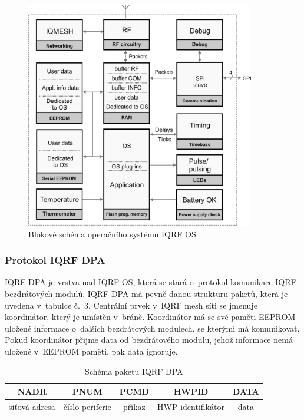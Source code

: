\documentclass[12pt,a4paper]{article}
\begin{document}
\begin{figure}[H]
\centering
\label{fig:foto/iqrf-os}
\includegraphics[width = 100mm]{img/iqrf/os-blokove-schema.png}
\caption{Blokové schéma operačního systému IQRF OS}
\end{figure}

\newpage

\subsubsection{Protokol IQRF DPA}

IQRF DPA\cite{iqrf/dpa} je vrstva nad IQRF OS, která se stará o~protokol komunikace IQRF bezdrátových modulů. IQRF DPA má pevně danou strukturu paketů, která je uvedena v~tabulce č.~3. Centrální prvek v~IQRF mesh síti se jmenuje koordinátor, který je umístěn v~bráně. Koordinátor má se své paměti EEPROM uložené informace o~dalších bezdrátových modulech, se kterými má komunikovat. Pokud koordinátor přijme data od bezdrátového modulu, jehož informace nemá uložené v~EEPROM paměti, pak data ignoruje.

\begin{table}[H]
\centering
\begin{tabular}{|c|c|c|c|c|}
\hline
NADR & PNUM & PCMD & HWPID & DATA \\
\hline
siťová adresa & číslo periferie & příkaz & HWP\index[zkr]{HWP!Hardware profile|textit} identifikátor & data \\
\hline
\end{tabular}
\caption{Schéma paketu IQRF DPA}\label{table:iqrf/dpa}
\end{table}
\end{document}
